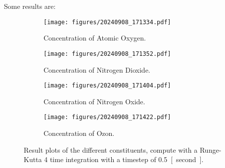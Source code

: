 \documentclass[biblatex]{deltares_memo}
\begin{document}
Some results are:
\begin{figure}[H]
    \begin{subfigure}{0.5\textwidth}
        \texttt{[image: figures/20240908\_171334.pdf]}
        \caption{Concentration of Atomic Oxygen.}
    \end{subfigure}
    \begin{subfigure}{0.5\textwidth}
        \texttt{[image: figures/20240908\_171352.pdf]}
        \caption{Concentration of Nitrogen Dioxide.}
    \end{subfigure}
    \begin{subfigure}{0.5\textwidth}
        \texttt{[image: figures/20240908\_171404.pdf]}
        \caption{Concentration of Nitrogen Oxide.}
    \end{subfigure}
    \begin{subfigure}{0.5\textwidth}
        \texttt{[image: figures/20240908\_171422.pdf]}
        \caption{Concentration of Ozon.}
    \end{subfigure}
    \caption{Result plots of the different constituents, compute with a Runge-Kutta 4 time integration with a timestep of \SI{0.5}{[second]}.}
\end{figure}

\end{document}
